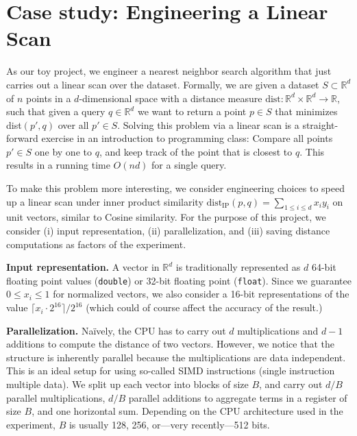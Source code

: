 \documentclass{llncs}
\newcommand{\myparagraph}[1]{\noindent \textbf{#1}}
\begin{document}
\section{Case study: Engineering a Linear Scan}

As our toy project, we engineer a nearest neighbor search algorithm that just carries out a linear scan over the dataset. 
Formally, we are given a dataset $S \subset \mathbb{R}^d$ of $n$ points in a $d$-dimensional space with a distance measure $\text{dist}\colon \mathbb{R}^d \times \mathbb{R}^d \rightarrow \mathbb{R}$, such that given a query $q \in \mathbb{R}^d$ we want to return a point $p \in S$ that minimizes dist$(p', q)$ over all $p' \in S$.
Solving this problem via a linear scan is a straight-forward exercise in an introduction to programming class: Compare all points $p' \in S$ one by one to $q$, and keep track of the point that is closest to $q$. This results in a running time $O(nd)$ for a single query.

To make this problem more interesting, we consider engineering choices to speed up a linear scan under inner product similarity $\text{dist}_{\text{IP}}(p,q) = \sum_{1 \leq i \leq d} x_i y_i$ on unit vectors, similar to Cosine similarity.
For the purpose of this project, we consider (i) input representation, (ii) parallelization, and (iii) saving distance computations as factors of the experiment.

\myparagraph{Input representation.}
A vector in $\mathbb{R}^d$ is traditionally represented as $d$ 64-bit floating point values (\texttt{double}) or 32-bit floating point (\texttt{float}). Since we guarantee $0 \leq x_i \leq 1$ for normalized vectors, we also consider a 16-bit representations of the value $\lceil x_i \cdot 2^{16} \rceil / 2^{16}$ (which could of course affect the accuracy of the result.)

\myparagraph{Parallelization.}
Naïvely, the CPU has to carry out $d$ multiplications and $d-1$ additions to compute the distance of two vectors.
However, we notice that the structure is inherently parallel because the multiplications are data independent. This is an ideal setup for using so-called SIMD instructions (single instruction multiple data). 
We split up each vector into blocks of size $B$, and carry out $d/B$ parallel multiplications, $d/B$ parallel additions to aggregate terms in a register of size $B$, and one horizontal sum. 
Depending on the CPU architecture used in the experiment, $B$ is usually 128, 256, or---very recently---512 bits.
\end{document}
